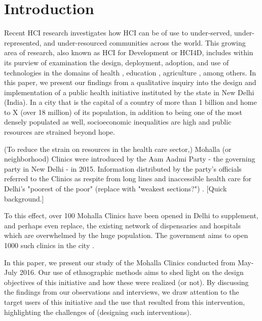 \section{Introduction}
\begin{comment}
High level overview of the phenomenon you are studying. Should be something the reader can immediately get behind and hook themselves to. 
Now carry the reader through your flow. Draw their focus to the more narrow context in which you did your work.  
“In this paper, we focus on…” Give the high level description of your research.
“This paper is structured as follows.” Give the outline. When you mention the discussion, also mention the main findings of the discussion.
\end{comment}

\textcolor{red}{}
Recent HCI research investigates how HCI can be of use to under-served, under-represented, and under-resourced communities across the world. This growing area of research, also known as HCI for Development or HCI4D, includes within its purview of examination the design, deployment, adoption, and use of technologies in the domains of health \cite{PH-CHI;TP}, education \cite{Kam}, agriculture \cite{Patel}, among others. In this paper, we present our findings from a qualitative inquiry into the design and implementation of a public health initiative instituted by the state in New Delhi (India). In a city that is the capital of a country of more than 1 billion and home to X (over 18 million) of its population, in addition to being one of the most densely populated as well, socioeconomic inequalities are high and public resources are strained beyond hope. 

(To reduce the strain on resources in the health care sector,) Mohalla (or neighborhood) Clinics were introduced by the Aam Aadmi Party - the governing party in New Delhi - in 2015. Information distributed by the party's officials referred to the Clinics as respite from long lines and inaccessible health care for Delhi's "poorest of the poor" (replace with "weakest sections?") \cite{AAPpressrelease}. [Quick background.]

To this effect, over 100 Mohalla Clinics have been opened in Delhi to supplement, and perhaps even replace, the existing network of dispensaries and hospitals which are overwhelmed by the huge population. The government aims to open 1000 such clinics in the city \cite{?}.

In this paper, we present our study of the Mohalla Clinics conducted from May-July 2016. Our use of ethnographic methods aims to shed light on the design objectives of this initiative and how these were realized (or not). By discussing the findings from our observations and interviews, we draw attention to the target users of this initiative and the use that resulted from this intervention, highlighting the challenges of (designing such interventions).

